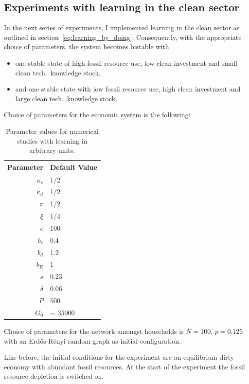 \subsection{Experiments with learning in the clean sector}

In the next series of experiments, I implemented learning in the clean sector as outlined in section~\ref{eq:learning_by_doing}.
Consequently, with the appropriate choice of parameters, the system becomes bistable with 
\begin{itemize}
	\item one stable state of high fossil resource use, low clean investment and small clean tech.\ knowledge stock,
	\item and one stable state with low fossil resource use, high clean investment and large clean tech.\ knowledge stock.
\end{itemize}
Choice of parameters for the economic system is the following:

\begin{table}[t] 
	\centering
	\begin{tabular}{r|l}
		Parameter & Default Value \\\hline
		$\kappa_c$ & 1/2 \\
		$\kappa_d$ & 1/2 \\
		$\pi$ & 1/2 \\
		$\xi$ & 1/4 \\
		$e$ & 100 \\
		$b_c$ & 0.4 \\
		$b_d$ & 1.2 \\
		$b_R$ & 1 \\
		$s$ & 0.23 \\
		$\delta $ & 0.06 \\
		$P$ & 500 \\
		$G_0$ & $\sim$ 35000 \\
	\end{tabular}
	\caption{Parameter values for numerical studies with learning in arbitrary units.}
	\label{tab:learning_parameter_values}
\end{table}

Choice of parameters for the network amongst households is $N=100$, $p=0.125$ with an Erd\H{o}s-R\'enyi random graph as initial configuration. 

Like before, the initial conditions for the experiment are an equilibrium dirty economy with abundant fossil resources. At the start of the experiment the fossil resource depletion is switched on.\

